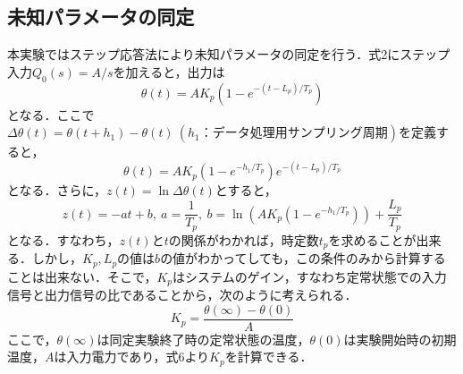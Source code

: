 \documentclass[11pt,a4paper]{jsarticle}
\begin{document}
  \subsection{未知パラメータの同定}
  本実験ではステップ応答法により未知パラメータの同定を行う．式2にステップ入力$Q_0(s) = A/s$を加えると，出力は
  \begin{equation}
   \theta (t) = A K_p \left(1-e^{-(t-L_p)/T_p}\right)
  \end{equation}
  となる．ここで$\Delta \theta (t) = \theta(t + h_1) - \theta(t) \ (h_1：データ処理用サンプリング周期)$を定義すると，
  \begin{equation}
   \theta(t) = AK_p \left( 1-e^{-h_1/T_p} \right) e^{-(t-L_p)/T_p}
  \end{equation}
  となる．さらに，$z(t) = \ln \Delta \theta (t)$とすると，
  \begin{equation}
   z(t) = -at+b, \ a = \frac{1}{T_p}, \ b = \ln \left( AK_p (1-e^{-h_1/T_p}) \right) + \frac{L_p}{T_p}
  \end{equation}
となる．すなわち，$z(t)$と$t$の関係がわかれば，時定数$t_p$を求めることが出来る．しかし，$K_p,L_p$の値は$b$の値がわかってしても，この条件のみから計算することは出来ない．そこで，$K_p$はシステムのゲイン，すなわち定常状態での入力信号と出力信号の比であることから，次のように考えられる．
\begin{equation}
 K_p = \frac{\theta(\infty) - \theta(0)}{A}
\end{equation}
ここで，$\theta(\infty)$は同定実験終了時の定常状態の温度，$\theta(0)$は実験開始時の初期温度，$A$は入力電力であり，式6より$K_p$を計算できる．
\end{document}
